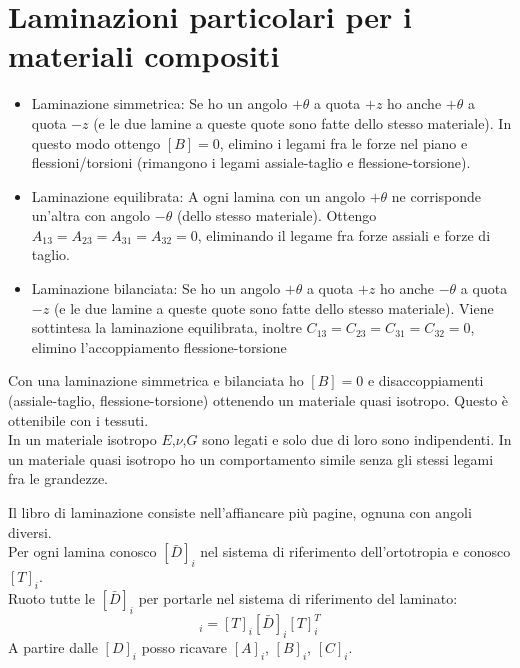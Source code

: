 \section{Laminazioni particolari per i materiali compositi}

\begin{itemize}
    \item Laminazione simmetrica:
    Se ho un angolo $+\theta$ a quota $+z$ ho anche $+\theta$ a quota $-z$ (e le due lamine a queste quote sono fatte dello stesso materiale).
    In questo modo ottengo $[B]=0$, elimino i legami fra le forze nel piano e flessioni/torsioni (rimangono i legami assiale-taglio e flessione-torsione).\\
    \item Laminazione equilibrata:
    A ogni lamina con un angolo  $+\theta$ ne corrisponde un'altra con angolo  $-\theta$ (dello stesso materiale).
    Ottengo $A_{13}=A_{23}=A_{31}=A_{32}=0$, eliminando il legame fra forze assiali e forze di taglio.\\
    \item Laminazione bilanciata:
    Se ho un angolo $+\theta$ a quota $+z$ ho anche $-\theta$ a quota $-z$ (e le due lamine a queste quote sono fatte dello stesso materiale).
    Viene sottintesa la laminazione equilibrata, inoltre  $C_{13}=C_{23}=C_{31}=C_{32}=0$, elimino l'accoppiamento flessione-torsione
\end{itemize}

Con una laminazione simmetrica e bilanciata ho $[B]=0$ e disaccoppiamenti (assiale-taglio, flessione-torsione) ottenendo un materiale quasi isotropo. Questo è ottenibile con i tessuti.\\
In un materiale isotropo $E$,$\nu$,$G$ sono legati e solo due di loro sono indipendenti. In un materiale quasi isotropo ho un comportamento simile senza gli stessi legami fra le grandezze.

Il libro di laminazione consiste nell'affiancare più pagine, ognuna con angoli diversi. \\
Per ogni lamina conosco $[\bar{D}]_i$ nel sistema di riferimento dell'ortotropia e conosco $[T]_i$.\\
Ruoto tutte le $[\bar{D}]_i$ per portarle nel sistema di riferimento del laminato:
\begin{equation*}
    [D]_i =  [T]_i [\bar{D}]_i[T]_i^T
\end{equation*}
A partire dalle $[D]_i$ posso ricavare $[A]_i$, $[B]_i$, $[C]_i$.

